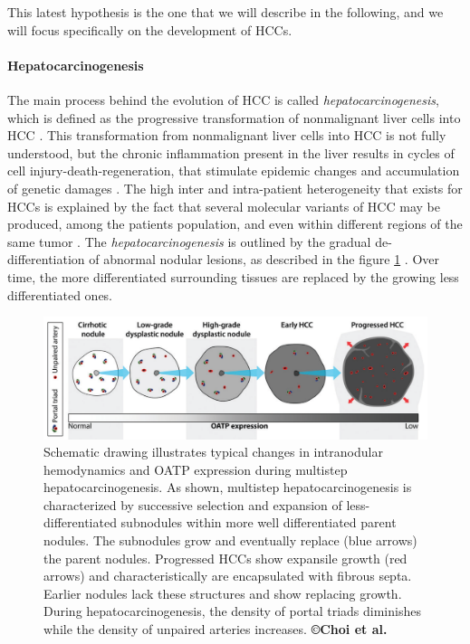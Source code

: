 \documentclass[]{article}
\let\oldparagraph\paragraph
\renewcommand{\paragraph}[1]{\oldparagraph{#1}\mbox{}}
\begin{document}
This latest hypothesis is the one that we will describe in the
following, and we will focus specifically on the development of
HCCs.

\paragraph{Hepatocarcinogenesis}\label{hepatocarcinogenesis}

The main process behind the evolution of HCC is called
\emph{hepatocarcinogenesis}, which is
defined as the progressive transformation of nonmalignant liver cells
into HCC \cite{Choi2014}. 
This transformation from nonmalignant liver cells into HCC is not
fully understood, but the chronic inflammation present in the liver
results in cycles of cell injury-death-regeneration, that stimulate
epidemic changes and accumulation of genetic damages \cite{Thorgeirsson2002,Aravalli2013,Brody2012,Trevisani2008a}. 
The high inter and intra-patient heterogeneity that exists for
HCCs is explained by the fact that several molecular variants of
HCC may be produced, among the patients population, and even
within different regions of the same tumor \cite{Trevisani2008a,Frenette2011}.
The \emph{hepatocarcinogenesis} is outlined by the gradual
de-differentiation of abnormal nodular lesions, as described in the
figure \ref{Choi2014_Fig1} \cite{Park2011,Frenette2011}. Over time, the more
differentiated surrounding tissues are replaced by the growing less
differentiated ones.

\begin{figure}[ht!]
\centering
\includegraphics[width=0.7\linewidth]{images/image4}
\caption{Schematic drawing illustrates typical changes in intranodular hemodynamics and OATP expression during multistep hepatocarcinogenesis. As shown, multistep hepatocarcinogenesis is characterized by successive selection and expansion of less-differentiated subnodules within more well differentiated parent nodules. The subnodules grow and eventually replace (blue arrows) the parent nodules. Progressed HCCs show expansile growth (red arrows) and characteristically are encapsulated with fibrous septa. Earlier nodules lack these structures and show replacing growth. During hepatocarcinogenesis, the density of portal triads diminishes while the density of unpaired arteries increases. \textbf{©Choi et al.} \cite{Choi2014}}
\label{Choi2014_Fig1}
\end{figure}
\end{document}
